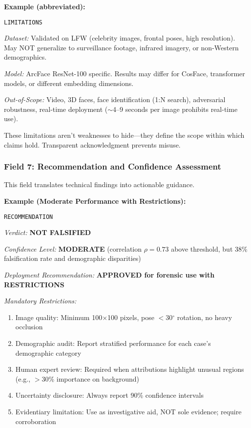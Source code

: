 \textbf{Example (abbreviated):}

\texttt{LIMITATIONS}

\textit{Dataset:} Validated on LFW (celebrity images, frontal poses, high resolution). May NOT generalize to surveillance footage, infrared imagery, or non-Western demographics.

\textit{Model:} ArcFace ResNet-100 specific. Results may differ for CosFace, transformer models, or different embedding dimensions.

\textit{Out-of-Scope:} Video, 3D faces, face identification (1:N search), adversarial robustness, real-time deployment ($\sim$4--9 seconds per image prohibits real-time use).

These limitations aren't weaknesses to hide—they define the scope within which claims hold. Transparent acknowledgment prevents misuse.

\subsubsection{Field 7: Recommendation and Confidence Assessment}

This field translates technical findings into actionable guidance.

\textbf{Example (Moderate Performance with Restrictions):}

\texttt{RECOMMENDATION}

\textit{Verdict:} \textbf{NOT FALSIFIED}

\textit{Confidence Level:} \textbf{MODERATE} (correlation $\rho=0.73$ above threshold, but 38\% falsification rate and demographic disparities)

\textit{Deployment Recommendation:} \textbf{APPROVED for forensic use with RESTRICTIONS}

\textit{Mandatory Restrictions:}
\begin{enumerate}
\item Image quality: Minimum 100$\times$100 pixels, pose $<$30$^\circ$ rotation, no heavy occlusion
\item Demographic audit: Report stratified performance for each case's demographic category
\item Human expert review: Required when attributions highlight unusual regions (e.g., $>$30\% importance on background)
\item Uncertainty disclosure: Always report 90\% confidence intervals
\item Evidentiary limitation: Use as investigative aid, NOT sole evidence; require corroboration
\end{enumerate}

